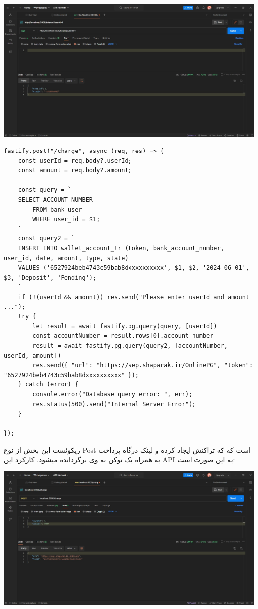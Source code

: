 \qquad \qquad \qquad \includegraphics[width=0.7\linewidth]{figs/api1.jpg}
\pagebreak
\setLTR
\begin{lstlisting} 
fastify.post("/charge", async (req, res) => {
    const userId = req.body?.userId;
    const amount = req.body?.amount;

    const query = `
    SELECT ACCOUNT_NUMBER
        FROM bank_user
        WHERE user_id = $1;
    `
    const query2 = `
    INSERT INTO wallet_account_tr (token, bank_account_number, user_id, date, amount, type, state)
    VALUES ('6527924beb4743c59bab8dxxxxxxxxxx', $1, $2, '2024-06-01', $3, 'Deposit', 'Pending');
    `
    if (!(userId && amount)) res.send("Please enter userId and amount ...");
    try {
        let result = await fastify.pg.query(query, [userId])
        const accountNumber = result.rows[0].account_number
        result = await fastify.pg.query(query2, [accountNumber, userId, amount])
        res.send({ "url": "https://sep.shaparak.ir/OnlinePG", "token": "6527924beb4743c59bab8dxxxxxxxxxx" });
    } catch (error) {
        console.error("Database query error: ", err);
        res.status(500).send("Internal Server Error");
    }

});
\end{lstlisting}
\setRTL
ریکوئست این بخش از نوع Post است که که تراکنش ایجاد کرده و لینک درگاه پرداخت به همراه یک توکن به وی برگردانده میشود. کارکرد این API به این صورت است:

\qquad \qquad \qquad \includegraphics[width=0.7\linewidth]{figs/api2.jpg}


